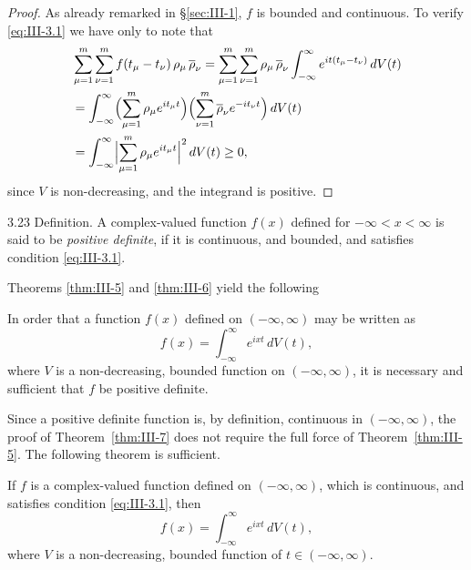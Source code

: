 \begin{proof}
As already remarked in \S\ref{sec:III-1}, $f$ is bounded and continuous. To verify \eqref{eq:III-3.1} we have only to note that
\begin{align*}
&\sum_{\mu=1}^{m}\sum_{\nu=1}^{m}f(t_{\mu}-t_{\nu})\,\rho_{\mu}\,\overline{\rho}_{\nu}
=\sum_{\mu=1}^{m}\sum_{\nu=1}^{m}\rho_{\mu}\,\overline{\rho}_{\nu}
\int_{-\infty}^{\infty}e^{it(t_{\mu}-t_{\nu})}\,dV(t)\\
&=\int_{-\infty}^{\infty}\Bigl(\sum_{\mu=1}^{m}\rho_{\mu}e^{it_{\mu}t}\Bigr)
\Bigl(\sum_{\nu=1}^{m}\overline{\rho}_{\nu}e^{-it_{\nu}t}\Bigr)\,dV(t)\\
&=\int_{-\infty}^{\infty}\Bigl|\sum_{\mu=1}^{m}\rho_{\mu}e^{it_{\mu}t}\Bigr|^{2}\,dV(t)\ge0,
\end{align*}
since $V$ is non-decreasing, and the integrand is positive.
\end{proof}

\begin{nstmt}{3.23}\label{eq:III-3.23}
Definition. A complex-valued function $f(x)$ defined for $-\infty<x<\infty$ is said to be \emph{positive definite}, if it is continuous, and bounded, and satisfies condition \eqref{eq:III-3.1}.
\end{nstmt}

Theorems \ref{thm:III-5} and \ref{thm:III-6} yield the following

\begin{theorem}[Bochner]\label{thm:III-7}
In order that a function $f(x)$ defined on $(-\infty,\infty)$ may be written as
\[
f(x)=\int_{-\infty}^{\infty}e^{ixt}\,dV(t),
\]
where $V$ is a non-decreasing, bounded function on $(-\infty,\infty)$, it is necessary and sufficient that $f$ be positive definite.
\end{theorem}

Since a positive definite function is, by definition, continuous in $(-\infty,\infty)$, the proof of Theorem~\ref{thm:III-7} does not require the full force of Theorem~\ref{thm:III-5}. The following theorem is sufficient.

\begin{theorem}\label{thm:III-8}
If $f$ is a complex-valued function defined on $(-\infty,\infty)$, which is continuous, and satisfies condition \eqref{eq:III-3.1}, then
\begin{equation}\tag{3.24}\label{eq:III-3.24}
f(x)=\int_{-\infty}^{\infty}e^{ixt}\,dV(t),
\end{equation}
where $V$ is a non-decreasing, bounded function of $t\in(-\infty,\infty)$.
\end{theorem}

